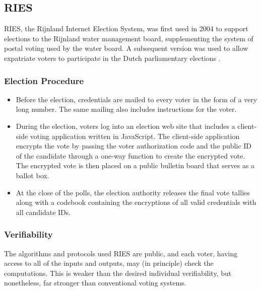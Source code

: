 
\subsection{RIES~\cite{hubbers2004}}

RIES, the Rijnland Internet Election System, was first used in 2004 to
support elections to the Rijnland water management board,
supplementing the system of postal voting used by the water board. A
subsequent version was used to allow expatriate voters to participate
in the Dutch parliamentary elections \cite{gonggrijp2009}.

\subsubsection{Election Procedure}

\begin{itemize}

\item Before the election, credentials are mailed to every voter in
  the form of a very long number. The same mailing also includes
  instructions for the voter.

\item During the election, voters log into an election web site that
  includes a client-side voting application written in JavaScript. The
  client-side application encrypts the vote by passing the voter
  authorization code and the public ID of the candidate through a
  one-way function to create the encrypted vote. The encrypted vote
  is then placed on a public bulletin board that serves as a ballot
  box.

\item At the close of the polls, the election authority releases the
  final vote tallies along with a codebook containing the encryptions
  of all valid credentials with all candidate IDs.

\end{itemize}

\subsubsection{Verifiability}

The algorithms and protocols used RIES are public, and each voter,
having access to all of the inputs and outputs, may (in principle)
check the computations. This is weaker than the desired individual
verifiability, but nonetheless, far stronger than
conventional voting systems.

